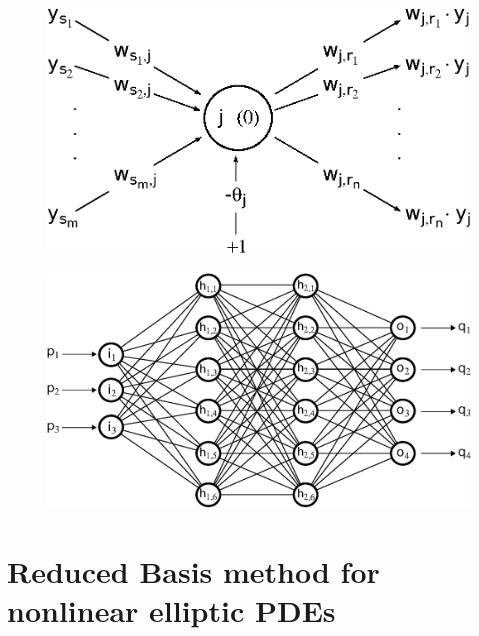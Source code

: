 \documentclass[11pt, a4paper]{report}
\theoremstyle{theorem}
\numberwithin{equation}{section}
\numberwithin{figure}{section}
\begin{document}
		\begin{figure}[H]
			\center
			\includegraphics[scale = 0.7]{neural_model_bias.eps}
			
			\caption{}
			\label{fig:neural-model-bias}
		\end{figure}
		
		\begin{figure}[H]
			\center
			\includegraphics[scale = 0.6]{neural_network_bis.eps}
			
			\caption{}
			\label{fig:neural-network}
		\end{figure}
		
	 
		 
		 
		 

	\chapter{Reduced Basis method for nonlinear elliptic PDEs}
	\label{chapter:Reduced Basis method for nonlinear elliptic PDEs}
	
\end{document}
